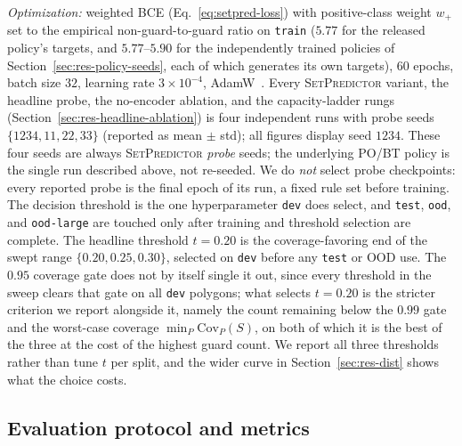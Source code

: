 \documentclass[11pt]{article}
\newcommand{\Covf}[1]{\mathrm{Cov}_P(#1)}
\newcommand{\SetPredictor}{\textup{\textsc{SetPredictor}}}
\begin{document}
\medskip

\emph{Optimization:} weighted BCE (Eq.~\eqref{eq:setpred-loss}) with positive-class weight $w_{+}$ set to the empirical non-guard-to-guard ratio on \texttt{train} ($5.77$ for the released policy's targets, and $5.77$--$5.90$ for the independently trained policies of Section~\ref{sec:res-policy-seeds}, each of which generates its own targets), $60$ epochs, batch size $32$, learning rate $3 \times 10^{-4}$, AdamW~\cite{Loshchilov2019AdamW}. Every \SetPredictor{} variant, the headline probe, the no-encoder ablation, and the capacity-ladder rungs (Section~\ref{sec:res-headline-ablation}) is four independent runs with probe seeds $\{1234, 11, 22, 33\}$ (reported as mean $\pm$ std); all figures display seed $1234$. These four seeds are always \SetPredictor{} \emph{probe} seeds; the underlying PO/BT policy is the single run described above, not re-seeded. We do \emph{not} select probe checkpoints: every reported probe is the final epoch of its run, a fixed rule set before training. The decision threshold is the one hyperparameter \texttt{dev} does select, and \texttt{test}, \texttt{ood}, and \texttt{ood-large} are touched only after training and threshold selection are complete. The headline threshold $t = 0.20$ is the coverage-favoring end of the swept range $\{0.20, 0.25, 0.30\}$, selected on \texttt{dev} before any \texttt{test} or OOD use. The $0.95$ coverage gate does not by itself single it out, since every threshold in the sweep clears that gate on all \texttt{dev} polygons; what selects $t = 0.20$ is the stricter criterion we report alongside it, namely the count remaining below the $0.99$ gate and the worst-case coverage $\min_P \Covf{S}$, on both of which it is the best of the three at the cost of the highest guard count. We report all three thresholds rather than tune $t$ per split, and the wider curve in Section~\ref{sec:res-dist} shows what the choice costs.

\subsection{Evaluation protocol and metrics}
\label{sec:exp-eval}
\end{document}
